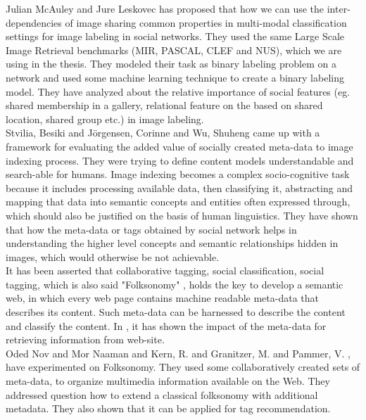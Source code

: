 \hspace*{1cm} Julian McAuley and Jure Leskovec \cite{McAuley} has proposed that how we can use the inter-dependencies of image sharing common properties in multi-modal classification settings for image labeling in social networks. They used the same Large Scale Image Retrieval benchmarks (MIR, PASCAL, CLEF and NUS), which we are using in the thesis. They modeled their task as binary labeling problem on a network and used some machine learning technique to create a binary labeling model. They have analyzed about the relative importance of social features (eg. shared membership in a gallery, relational feature on the based on shared location, shared group etc.) in image labeling.\\
\hspace*{1cm} Stvilia, Besiki and J\"{o}rgensen, Corinne and Wu, Shuheng \cite{imageIndexing} came up with a framework for evaluating the added value of socially created meta-data to image indexing process. They were trying to define content models understandable and search-able for humans. Image indexing becomes a complex socio-cognitive task because it includes processing available data, then classifying it, abstracting and mapping that data into semantic concepts and entities often expressed through, which should also be justified on the basis of human linguistics. They have shown that how the meta-data or tags obtained by social network helps in understanding the higher level concepts and semantic relationships hidden in images, which would otherwise be not achievable.\\
\hspace*{1cm} It has been asserted that collaborative tagging, social classification, social tagging, which is also said "Folksonomy" \cite{wikiFolksonomy}, holds the key to develop a semantic web, in which every web page contains machine readable meta-data that describes its content. Such meta-data can be harnessed to describe the content and classify the content.  In \cite{webResources}, it has shown the impact of the meta-data for retrieving information from web-site.\\
\hspace*{1cm}Oded Nov and Mor Naaman \cite{nov} and Kern, R. and Granitzer, M. and Pammer, V. \cite{kern}, have experimented on Folksonomy.
They used some collaboratively created sets of meta-data, to organize multimedia information available on the Web. They addressed question how to extend a classical folksonomy with additional metadata. They also shown that it can be applied for tag recommendation.\\
